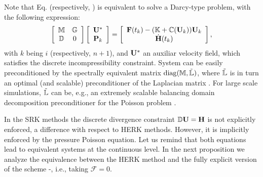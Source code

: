 {
\begin{remark}
Note that Eq.  (respectively, ) is equivalent to solve a Darcy-type problem, with the following expression:
\begin{equation}
\label{eq-C6_IMEX_up_RK_p_darcy}
\left[\begin{array}{cc}
\mathbb{M}&\mathbb{G}\\
\mathbb{D}&0
\end{array}\right]\left[\begin{array}{c}
{\bf U}^*\\
{\bf P}_k
\end{array}\right]=\left[\begin{array}{c}
{\bf F}(t_k) - (\mathbb{K}+\mathbb{C}({\bf U}_k)){\bf U}_k\\
\dot{\bf{H}}(t_k)
\end{array}\right],
\end{equation}
with $k$ being $i$ (respectively, $n+1$), and ${\bf U}^*$ an auxiliar velocity field, which satisfies the discrete incompressibility constraint. System  can be easily preconditioned by the spectrally equivalent matrix ${\rm diag}(\mathbb{M},\tilde {\mathbb{L}})$, where $\tilde {\mathbb{L}}$ is in turn an optimal (and scalable) preconditioner of the Laplacian matrix \cite{badia_algebraic_2008,elman_finite_2005}. For large scale simulations, $\tilde {\mathbb{L}}$ can be, e.g., an extremely scalable balancing domain decomposition  preconditioner for the Poisson problem \cite{badia_implementation_2013,badia_highly_2014,art008}. \end{remark}}

In the SRK methods the discrete divergence constraint $\mathbb{D}{\bf U} = \bf{H}$ is not explicitly enforced, a difference with respect to HERK methods. However, it is implicitly enforced by the pressure Poisson equation. Let us remind that both equations lead to equivalent systems at the continuous level. In the next proposition we analyze the equivalence between the HERK method and the fully explicit version of the scheme -, i.e., taking $\mathcal{F} = 0$. 

